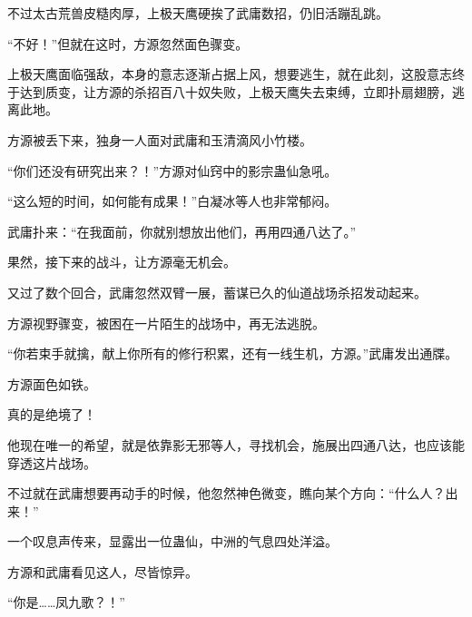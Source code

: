 \begin{this_body}
不过太古荒兽皮糙肉厚，上极天鹰硬挨了武庸数招，仍旧活蹦乱跳。

“不好！”但就在这时，方源忽然面色骤变。

上极天鹰面临强敌，本身的意志逐渐占据上风，想要逃生，就在此刻，这股意志终于达到质变，让方源的杀招百八十奴失败，上极天鹰失去束缚，立即扑扇翅膀，逃离此地。

方源被丢下来，独身一人面对武庸和玉清滴风小竹楼。

“你们还没有研究出来？！”方源对仙窍中的影宗蛊仙急吼。

“这么短的时间，如何能有成果！”白凝冰等人也非常郁闷。

武庸扑来：“在我面前，你就别想放出他们，再用四通八达了。”

果然，接下来的战斗，让方源毫无机会。

又过了数个回合，武庸忽然双臂一展，蓄谋已久的仙道战场杀招发动起来。

方源视野骤变，被困在一片陌生的战场中，再无法逃脱。

“你若束手就擒，献上你所有的修行积累，还有一线生机，方源。”武庸发出通牒。

方源面色如铁。

真的是绝境了！

他现在唯一的希望，就是依靠影无邪等人，寻找机会，施展出四通八达，也应该能穿透这片战场。

不过就在武庸想要再动手的时候，他忽然神色微变，瞧向某个方向：“什么人？出来！”

一个叹息声传来，显露出一位蛊仙，中洲的气息四处洋溢。

方源和武庸看见这人，尽皆惊异。

“你是……凤九歌？！”

\end{this_body}

